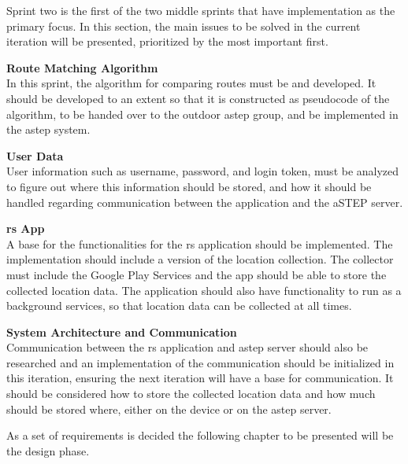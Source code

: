 Sprint two is the first of the two middle sprints that have implementation as the primary focus. In this section, the main issues to be solved in the current iteration will be presented, prioritized by the most important first.

\textbf{Route Matching Algorithm}\\
In this sprint, the algorithm for comparing routes must be and developed. 
It should be developed to an extent so that it is constructed as pseudocode of the algorithm, to be handed over to the outdoor \gls{astep} group, and be implemented in the \gls{astep} system.

\textbf{User Data}\\
User information such as username, password, and login token, must be analyzed to figure out where this information should be stored, and how it should be handled regarding communication between the application and the aSTEP server. 

\textbf{\gls{rs} App}\\
A base for the functionalities for the \gls{rs} application should be implemented. 
The implementation should include a version of the location collection.
The collector must include the Google Play Services and the app should be able to store the collected location data. 
The application should also have functionality to run as a background services, so that location data can be collected at all times.

\textbf{System Architecture and Communication}\\
Communication between the \gls{rs} application and \gls{astep} server should also be researched and an implementation of the communication should be initialized in this iteration, ensuring the next iteration will have a base for communication. 
It should be considered how to store the collected location data and how much should be stored where, either on the device or on the \gls{astep} server.


As a set of requirements is decided the following chapter to be presented will be the design phase.